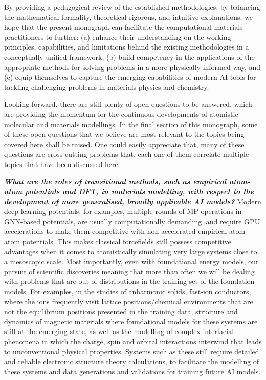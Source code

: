 By providing a pedagogical review of the established methodologies, by balancing the mathematical formality, theoretical rigorous, and intuitive explanations, we hope that the present monograph can facilitate the computational materials practitioners to further: (a) enhance their understanding on the working principles, capabilities, and limitations behind the existing methodologies in a conceptually unified framework, (b) build competency in the applications of the appropriate methods for solving problems in a more physically informed way, and (c) equip themselves to capture the emerging capabilities of modern AI tools for tackling challenging problems in materials physics and chemistry.

Looking forward,  there are still plenty of open questions to be answered, which are providing the momentum for the continuous developments of  atomistic molecular and materials modellings. In the final section of this monograph, some of these open questions that we believe are most relevant to the topics being covered here  shall be raised. One could easily appreciate that, many of these questions are cross-cutting problems that, each one of them  correlate multiple topics that have been discussed here. 

\textit{\textbf{What are the roles of transitional methods, such as empirical atom-atom potentials and DFT, in materials modelling, with respect to the development of more generalised, broadly applicable AI models?}} Modern deep-learning potentials, for examples, multiple rounds of MP operations in GNN-based potentials, are usually computationally demanding, and require GPU accelerations to make them competitive with non-accelerated empirical atom-atom potentials.\cite{leimeroth2025machine} This makes classical forcefields still possess competitive advantages when it comes to atomistically simulating very large systems close to a mesoscopic scale. Most importantly, even with foundational energy models,\cite{batatia2023foundation} our pursuit of scientific discoveries meaning that more than often we will be dealing with problems that are out-of-distributions in the training set of the foundation models. For examples, in the studies of anharmonic solids,\cite{yang2026mace} fast-ion conductors,\cite{ding2025liquid} where the ions frequently visit lattice positions/chemical environments that are not the equilibrium positions presented in the training data, structure and dynamics of magnetic materials where foundational models for these systems are still at the emerging state,\cite{ho2026equivariant} as well as the modelling of complex interfacial phenomena in which the charge, spin and orbital interactions interwind that leads to unconventional physical properties. Systems such as these still require detailed and reliable electronic structure theory calculations, to facilitate the modelling of these systems and data generations and validations for training future AI models. 

